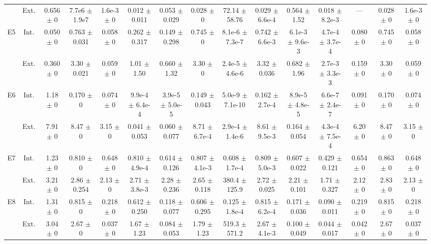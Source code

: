 \begin{table}[htbp]
{\begin{tabular}{@{}ccccccccccccccc@{}}
 & Ext. & 0.656 $\pm$ 0 & 7.7e6 $\pm$ 1.9e7 & 1.6e-3 $\pm$ 0 & 0.012 $\pm$ 0.011 & 0.053 $\pm$ 0.029 & 0.028 $\pm$ 0 & 72.14 $\pm$ 58.76 & 0.029 $\pm$ 6.6e-4 & 0.564 $\pm$ 1.52 & 0.018 $\pm$ 8.2e-3 & --- & 0.028 $\pm$ 0 & 1.6e-3 $\pm$ 0 \\
\cline{2-15}
\multirow{2}{*}{E5} & Int. & 0.050 $\pm$ 0 & 0.763 $\pm$ 0.031 & 0.058 $\pm$ 0 & 0.262 $\pm$ 0.317 & 0.149 $\pm$ 0.298 & 0.745 $\pm$ 0 & 8.1e-6 $\pm$ 7.3e-7 & 0.742 $\pm$ 6.6e-3 & 6.1e-3 $\pm$ 9.6e-3 & 4.7e-4 $\pm$ 3.7e-4 & 0.080 $\pm$ 0 & 0.745 $\pm$ 0 & 0.058 $\pm$ 0 \\
 & Ext. & 0.360 $\pm$ 0 & 3.30 $\pm$ 0.021 & 0.059 $\pm$ 0 & 1.01 $\pm$ 1.50 & 0.660 $\pm$ 1.32 & 3.30 $\pm$ 0 & 2.4e-5 $\pm$ 4.6e-6 & 3.32 $\pm$ 0.036 & 0.682 $\pm$ 1.96 & 2.7e-3 $\pm$ 3.3e-3 & 0.159 $\pm$ 0 & 3.30 $\pm$ 0 & 0.059 $\pm$ 0 \\
\cline{2-15}
\multirow{2}{*}{E6} & Int. & 1.18 $\pm$ 0 & 0.170 $\pm$ 0 & 0.074 $\pm$ 0 & 9.9e-4 $\pm$ 6.4e-4 & 3.9e-5 $\pm$ 5.0e-5 & 0.149 $\pm$ 0.043 & 5.0e-9 $\pm$ 7.1e-10 & 0.162 $\pm$ 2.7e-4 & 8.9e-5 $\pm$ 4.8e-5 & 6.6e-7 $\pm$ 2.4e-7 & 0.091 $\pm$ 0 & 0.170 $\pm$ 0 & 0.074 $\pm$ 0 \\
 & Ext. & 7.91 $\pm$ 0 & 8.47 $\pm$ 0 & 3.15 $\pm$ 0 & 0.041 $\pm$ 0.053 & 0.060 $\pm$ 0.077 & 8.71 $\pm$ 6.7e-4 & 2.9e-4 $\pm$ 1.4e-6 & 8.61 $\pm$ 9.5e-3 & 0.164 $\pm$ 0.054 & 4.3e-4 $\pm$ 7.5e-4 & 6.20 $\pm$ 0 & 8.47 $\pm$ 0 & 3.15 $\pm$ 0 \\
\cline{2-15}
\multirow{2}{*}{E7} & Int. & 1.23 $\pm$ 0 & 0.810 $\pm$ 0 & 0.648 $\pm$ 0 & 0.810 $\pm$ 4.9e-4 & 0.614 $\pm$ 0.126 & 0.807 $\pm$ 4.1e-3 & 0.608 $\pm$ 1.7e-4 & 0.809 $\pm$ 5.0e-3 & 0.607 $\pm$ 0.022 & 0.429 $\pm$ 0.121 & 0.654 $\pm$ 0 & 0.863 $\pm$ 0 & 0.648 $\pm$ 0 \\
 & Ext. & 3.21 $\pm$ 0 & 2.86 $\pm$ 0.254 & 2.13 $\pm$ 0 & 2.71 $\pm$ 3.8e-3 & 2.28 $\pm$ 0.236 & 2.65 $\pm$ 0.118 & 380.4 $\pm$ 125.9 & 2.72 $\pm$ 0.025 & 2.21 $\pm$ 0.101 & 1.71 $\pm$ 0.327 & 2.12 $\pm$ 0 & 2.83 $\pm$ 0 & 2.13 $\pm$ 0 \\
\cline{2-15}
\multirow{2}{*}{E8} & Int. & 1.31 $\pm$ 0 & 0.815 $\pm$ 0 & 0.218 $\pm$ 0 & 0.612 $\pm$ 0.250 & 0.118 $\pm$ 0.077 & 0.606 $\pm$ 0.295 & 0.125 $\pm$ 1.8e-4 & 0.815 $\pm$ 6.2e-4 & 0.171 $\pm$ 0.036 & 0.090 $\pm$ 0.011 & 0.219 $\pm$ 0 & 0.815 $\pm$ 0 & 0.218 $\pm$ 0 \\
 & Ext. & 3.04 $\pm$ 0 & 2.67 $\pm$ 0 & 0.037 $\pm$ 0 & 1.67 $\pm$ 1.23 & 0.084 $\pm$ 0.053 & 1.79 $\pm$ 1.23 & 519.3 $\pm$ 571.2 & 2.67 $\pm$ 4.1e-3 & 0.100 $\pm$ 0.049 & 0.044 $\pm$ 0.017 & 0.042 $\pm$ 0 & 2.67 $\pm$ 0 & 0.037 $\pm$ 0 \\

\end{tabular}}
\end{table}
